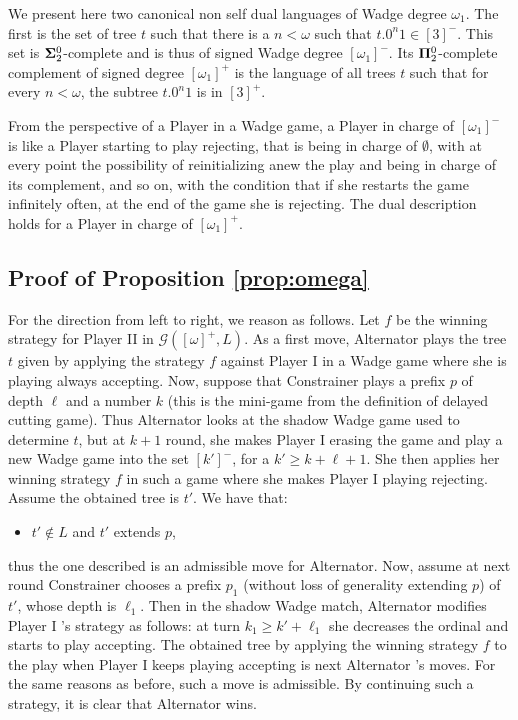 \noindent We present here two canonical non self dual languages of Wadge degree $\omega_1$. The first is the set of tree $t$ such that there is a $n<\omega$ such that $t.0^n1 \in [3]^-$. This set is ${\bf \Sigma}^0_2$-complete and is thus of signed Wadge degree $[\omega_1]^-$. Its ${\bf \Pi}^0_2$-complete complement of signed degree $[\omega_1]^+$ is the language of all trees $t$ such that for every $n<\omega$, the subtree $t.0^n1$ is in  $[3]^+$.

From the perspective of a Player in a Wadge game, a Player in charge of $[\omega_1]^-$ is like a Player starting to play rejecting, that is being in charge of $\emptyset$, with at every point the possibility of reinitializing anew the play and being in charge of its complement, and so on, with the condition that if she restarts the game infinitely often, at the end of the game she is rejecting. 
The dual description holds for a Player in charge of $[\omega_1]^+$.

\subsection*{Proof of Proposition \ref{prop:omega}}
For the direction from left to right, we reason as follows. Let $f$ be the winning strategy for Player II in $\mathcal{G}([\omega]^+, L)$. As a first move, Alternator plays the tree $t$ given by applying the strategy $f$ against Player I in a Wadge game where she is playing always accepting. Now, suppose that Constrainer plays a prefix $p$ of depth $\ell$ and a number $k$ (this is the mini-game from the definition of delayed cutting game). Thus Alternator looks at the shadow Wadge game used to determine $t$, but at $k+1$ round, she makes Player I erasing the game and play a new Wadge game into the set $[k']^-$, for a $k' \geq k + \ell +1$. She then  applies her winning strategy $f$ in such a game where she makes Player I playing rejecting. Assume the obtained tree is $t'$. We have that:
\begin{itemize}
\item $t' \notin L$ and $t'$ extends $p$,
\end{itemize}
thus the one described is an admissible move for Alternator.
Now, assume at next round Constrainer chooses a prefix $p_1$ (without loss of generality extending $p$) of $t'$, whose depth is $\ell_1$. Then in the shadow Wadge match, Alternator modifies Player I 's strategy as follows: at turn $k_1 \geq k' + \ell_1$ she decreases the ordinal and starts to play accepting. The obtained tree by applying the winning strategy $f$ to the play when  Player  I keeps playing accepting is next Alternator 's moves. For the same reasons as before, such a move is admissible. By continuing such a strategy, it is clear that Alternator wins.

